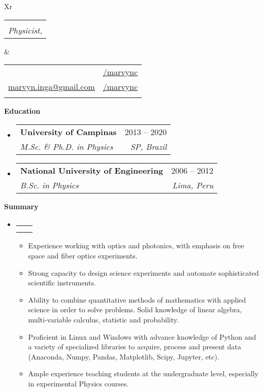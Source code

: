 \documentclass[letterpaper,12pt]{article}[leftmargin=*]
\makeatletter
\def \fullname {Marvyn Inga}
\def \subtitle {Physicist, \faMale}
\def \linkedinicon {\faLinkedin}
\def \linkedinlink {https://www.linkedin.com/in/marvync/}
\def \linkedintext {/marvync}
\def \phoneicon {\faPhone}
\def \phonetext {+55-19-983638657}
\def \emailicon {\faEnvelope}
\def \emaillink {mailto:marvyn.inga@gmail.com}
\def \emailtext {marvyn.inga@gmail.com}
\def \githubicon {\faGithub}
\def \githublink {https://github.com/marvync}
\def \githubtext {/marvync}
\def \headertype {\doublecol} %
\def \entryspacing {-0pt}
\def \linkedin {\linkedinicon \hspace{3pt}\href{\linkedinlink}{\linkedintext}}
\def \phone {\phoneicon \hspace{3pt}{ \phonetext}}
\def \email {\emailicon \hspace{3pt}\href{\emaillink}{\emailtext}}
\def \github {\githubicon \hspace{3pt}\href{\githublink}{\githubtext}}
\renewcommand{\section}[2]{\vspace{5pt}
  \colorbox{secondary}{\color{white}\raggedbottom\normalsize\textbf{{#1}{\hspace{7pt}#2}}}
}
\newcommand{\resumeEntryStart}{\begin{itemize}[leftmargin=2.5mm]}
\newcommand{\resumeEntryEnd}{\end{itemize}\vspace{\entryspacing}}
\newcommand{\resumeItemListStart}{\begin{itemize}[leftmargin=4.5mm]}
\newcommand{\resumeItemListEnd}{\end{itemize}}
\newcommand{\resumeItem}[1]{
  \item\small{
    {#1 \vspace{-2pt}}
  }
}
\newcommand{\resumeEntryTSDL}[4]{
  \vspace{-1pt}\item[]
    \begin{tabularx}{0.97\textwidth}{X@{\hspace{60pt}}r}
      \textbf{\color{primary}#1} & {\firabook\color{accent}\small#2} \\
      \textit{\color{accent}\small#3} & \textit{\color{accent}\small#4} \\
    \end{tabularx}\vspace{-6pt}
}
\newcommand{\doublecol}[6]{
  \begin{tabularx}{\textwidth}{Xr}
    {
      \begin{tabular}[c]{l}
        \fontsize{35}{45}\selectfont{\color{primary}{{\textbf{\fullname}}}} \\
        {\textit{\subtitle}} %
      \end{tabular}
    } & {
      \begin{tabular}[c]{l@{\hspace{1.5em}}l}
        {\small#4} & {\small#1} \\
        {\small#5} & {\small#2} \\
        {\small#6} & {\small#3}
      \end{tabular}
    }
  \end{tabularx}
}
\newcommand{\singlecol}[6]{
  \begin{tabularx}{\textwidth}{Xr}
    {
      \begin{tabular}[b]{l}
        \fontsize{35}{45}\selectfont{\color{primary}{{\textbf{\fullname}}}} \\
        {\textit{\subtitle}} %
      \end{tabular}
    } & {
      \begin{tabular}[c]{l}
        {\small#1} \\
        {\small#2} \\
        {\small#3} \\
        {\small#4} \\
        {\small#5} \\
        {\small#6}
      \end{tabular}
    }
  \end{tabularx}
}
\makeatother
\begin{document}


\headertype{\linkedin}{\github}{}{\phone}{\email}{} %

\section{\faGraduationCap}{Education}
\vspace{-0.05cm}
\resumeEntryStart
	\resumeEntryTSDL
    {University of Campinas}{2013 -- 2020}
	{M.Sc. \& Ph.D. in Physics}{SP, Brazil}
\resumeEntryEnd

\vspace{-0.4cm}

\resumeEntryStart
	\resumeEntryTSDL
	{National University of Engineering}{2006 -- 2012}
	{B.Sc. in Physics}{Lima, Peru}
\resumeEntryEnd
\vspace{-0.2cm}

\section{\faFolderOpen}{Summary}
\vspace{-1.3cm}

\resumeEntryStart
\resumeEntryTSDL
{}{}
{}{}
\resumeItemListStart
\resumeItem {Experience working with optics and photonics, with emphasis on free space and fiber optics experiments.}
\resumeItem {Strong capacity to design science experiments and automate sophisticated scientific instruments.}
\resumeItem {Ability to combine quantitative methods of mathematics with applied science in order to solve problems. Solid knowledge of linear algebra, multi-variable calculus, statistic and probability.}
\resumeItem {Proficient in Linux and Windows with advance knowledge of Python and a variety of specialized libraries to acquire, process and present data (Anaconda, Numpy, Pandas, Matplotlib, Scipy, Jupyter, etc).}
\resumeItem {Ample experience teaching students at the undergraduate level, especially in experimental Physics courses.}
\resumeItemListEnd
\resumeEntryEnd
\vspace{-0.2cm}
\end{document}
